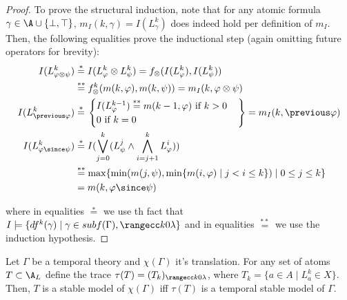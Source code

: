 \begin{proof}
  To prove the structural induction, note that for any atomic formula
  $\gamma \in \A \cup \{ \bot, \top \}$,
  $m_I(k,\gamma) = I(L^k_\gamma)$ does indeed hold per definition of
  $m_I$. Then, the following equalities prove the inductional step
  (again omitting future operators for brevity):
  \begin{align*}
  I(L^k_{\varphi \otimes \psi}) &\stackrel{*}{=} I(L^k_{\varphi} \otimes L^k_{\psi})
  =  f_{\otimes}(I(L^k_\varphi),I(L^k_\psi))\\
  &\stackrel{**}{=} f_{\otimes}^k(m(k,\varphi),m(k,\psi)) =  m_I(k,\varphi \otimes \psi)\\
  I(L^k_{\previous \varphi}) &\stackrel{*}{=} \left. \begin{cases}
    I(L^{k-1}_\varphi)  \stackrel{**}{=} m(k-1,\varphi) \text{ if } k > 0\\
    0 \text{ if } k = 0
    \end{cases} \right\} = m_I(k,\previous \varphi)\\
  I(L^k_{\varphi \since \psi}) 
    & \stackrel{*}{=}  I(\bigvee_{j=0}^{k}(L_\psi^j \wedge \bigwedge_{i=j+1}^{k}L_{\varphi}^i)) \\
    & \stackrel{**}{=} \max \{\min (m(j, \psi), \min \{m(i, \varphi) \mid j<i \leq k\}) \mid 0 \leq j \leq k\} \\
    & =  m(k,\varphi \since \psi)
  \end{align*}

  where in equalities $\stackrel{*}{=}$ we use th fact that $I \models
  \{ df^k(\gamma) \mid \gamma \in subf(\Gamma), \kinlambda
  \}$ and in equalities
  $\stackrel{**}{=}$ we use the induction hypothesis.
\end{proof}

\begin{corollary}\label{cor:bijection-of-sm}
  Let $\Gamma$ be a temporal theory and $\chi(\Gamma)$ it's
  translation. For any set of atoms $T \subset \A_L$ define the
  trace $\tau(T)=(T_k)_{\kinlambda}$, where
  $T_k = \{ a \in A \mid L_a^k \in X \}$. Then, $T$ is a stable model of
  $\chi(\Gamma)$ iff $\tau(T)$ is a temporal stable model of
  $\Gamma$.
\end{corollary}

